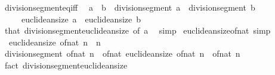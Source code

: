 \begin{isabellebody}
\isanewline
\isanewline
{}\isamarkupfalse%
\ division{\isacharunderscore}{\kern0pt}segment{\isacharunderscore}{\kern0pt}eq{\isacharunderscore}{\kern0pt}iff{\isacharcolon}{\kern0pt}\isanewline
\ \ {\isachardoublequoteopen}a\ {\isacharequal}{\kern0pt}\ b{\isachardoublequoteclose}\ \ {\isachardoublequoteopen}division{\isacharunderscore}{\kern0pt}segment\ a\ {\isacharequal}{\kern0pt}\ division{\isacharunderscore}{\kern0pt}segment\ b{\isachardoublequoteclose}\isanewline
\ \ \ \ \ {\isachardoublequoteopen}euclidean{\isacharunderscore}{\kern0pt}size\ a\ {\isacharequal}{\kern0pt}\ euclidean{\isacharunderscore}{\kern0pt}size\ b{\isachardoublequoteclose}\isanewline
%
\isadelimproof
\ \ %
\endisadelimproof
%
\isatagproof
{}\isamarkupfalse%
\ that\ division{\isacharunderscore}{\kern0pt}segment{\isacharunderscore}{\kern0pt}euclidean{\isacharunderscore}{\kern0pt}size\ {\isacharbrackleft}{\kern0pt}of\ a{\isacharbrackright}{\kern0pt}\ \isamarkupfalse%
\ simp%
\endisatagproof
{\isafoldproof}%
%
\isadelimproof
\isanewline
%
\endisadelimproof
\isanewline
{}\isamarkupfalse%
\ euclidean{\isacharunderscore}{\kern0pt}size{\isacharunderscore}{\kern0pt}of{\isacharunderscore}{\kern0pt}nat\ {\isacharbrackleft}{\kern0pt}simp{\isacharbrackright}{\kern0pt}{\isacharcolon}{\kern0pt}\isanewline
\ \ {\isachardoublequoteopen}euclidean{\isacharunderscore}{\kern0pt}size\ {\isacharparenleft}{\kern0pt}of{\isacharunderscore}{\kern0pt}nat\ n{\isacharparenright}{\kern0pt}\ {\isacharequal}{\kern0pt}\ n{\isachardoublequoteclose}\isanewline
%
\isadelimproof
%
\endisadelimproof
%
\isatagproof
{}\isamarkupfalse%
\ {\isacharminus}{\kern0pt}\isanewline
\ \ \isamarkupfalse%
\ {\isachardoublequoteopen}division{\isacharunderscore}{\kern0pt}segment\ {\isacharparenleft}{\kern0pt}of{\isacharunderscore}{\kern0pt}nat\ n{\isacharparenright}{\kern0pt}\ {\isacharasterisk}{\kern0pt}\ of{\isacharunderscore}{\kern0pt}nat\ {\isacharparenleft}{\kern0pt}euclidean{\isacharunderscore}{\kern0pt}size\ {\isacharparenleft}{\kern0pt}of{\isacharunderscore}{\kern0pt}nat\ n{\isacharparenright}{\kern0pt}{\isacharparenright}{\kern0pt}\ {\isacharequal}{\kern0pt}\ of{\isacharunderscore}{\kern0pt}nat\ n{\isachardoublequoteclose}\isanewline
\ \ \ \ \isamarkupfalse%
\ {\isacharparenleft}{\kern0pt}fact\ division{\isacharunderscore}{\kern0pt}segment{\isacharunderscore}{\kern0pt}euclidean{\isacharunderscore}{\kern0pt}size{\isacharparenright}{\kern0pt}\isanewline
\ \ \isamarkupfalse%

\end{isabellebody}
